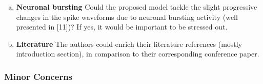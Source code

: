 \begin{enumerate}[a.]
	\item \textbf{Neuronal bursting} Could the proposed model tackle the slight progressive changes in the spike waveforms due to neuronal bursting activity (well presented in [11])? If yes, it would be important to be stressed out.
	
	
	\item \textbf{Literature} The authors could enrich their literature references (mostly introduction section), in comparison to their corresponding conference paper.
	
	
\end{enumerate}




\subsubsection{Minor Concerns} %
\label{ssub:minor_concerns}



